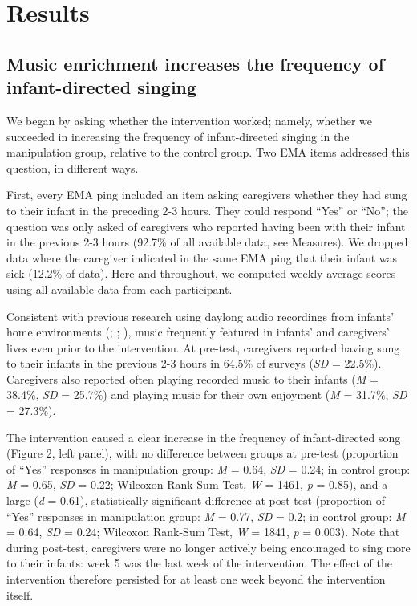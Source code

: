 \documentclass[
]{article}
\begin{document}
\section{Results}\label{results}

\subsection{Music enrichment increases the frequency of infant-directed
singing}\label{music-enrichment-increases-the-frequency-of-infant-directed-singing}

We began by asking whether the intervention worked; namely, whether we
succeeded in increasing the frequency of infant-directed singing in the
manipulation group, relative to the control group. Two EMA items
addressed this question, in different ways.

First, every EMA ping included an item asking caregivers whether they
had sung to their infant in the preceding 2-3 hours. They could respond
``Yes'' or ``No''; the question was only asked of caregivers who
reported having been with their infant in the previous 2-3 hours (92.7\%
of all available data, see Measures). We dropped data where the
caregiver indicated in the same EMA ping that their infant was sick
(12.2\% of data). Here and throughout, we computed weekly average scores
using all available data from each participant.

Consistent with previous research using daylong audio recordings from
infants' home environments (; ; ), music frequently featured in infants' and caregivers' lives even
prior to the intervention. At pre-test, caregivers reported having sung
to their infants in the previous 2-3 hours in 64.5\% of surveys
(\emph{SD} = 22.5\%). Caregivers also reported often playing recorded
music to their infants (\emph{M} = 38.4\%, \emph{SD} = 25.7\%) and
playing music for their own enjoyment (\emph{M} = 31.7\%, \emph{SD} =
27.3\%).

The intervention caused a clear increase in the frequency of
infant-directed song (Figure 2, left panel), with no difference between
groups at pre-test (proportion of ``Yes'' responses in manipulation
group: \emph{M} = 0.64, \emph{SD} = 0.24; in control group: \emph{M} =
0.65, \emph{SD} = 0.22; Wilcoxon Rank-Sum Test, \emph{W} = 1461,
\emph{p} = 0.85), and a large (\emph{d} = 0.61), statistically
significant difference at post-test (proportion of ``Yes'' responses in
manipulation group: \emph{M} = 0.77, \emph{SD} = 0.2; in control group:
\emph{M} = 0.64, \emph{SD} = 0.24; Wilcoxon Rank-Sum Test, \emph{W} =
1841, \emph{p} = 0.003). Note that during post-test, caregivers were no
longer actively being encouraged to sing more to their infants: week 5
was the last week of the intervention. The effect of the intervention
therefore persisted for at least one week beyond the intervention
itself.
\end{document}
